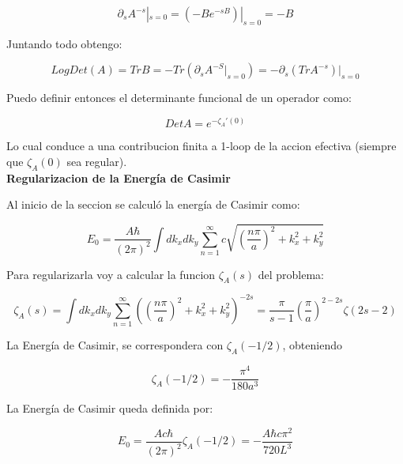 \begin{equation}
\partial _s A ^{-s} | _{s=0} = (- B e ^{-s B}) | _{s=0} = - B
\end{equation}

Juntando todo obtengo:

\begin{equation}
Log Det ( A ) = Tr B = - Tr  \left( \partial _s A ^{-S} | _{s=0} \right) =
 - \partial _s \left( Tr A ^{-s} \right) | _{s=0}
\end{equation}

Puedo definir entonces el determinante funcional de un operador como:

\begin{equation}
Det A = e ^{- \zeta _A ' (0)}
\end{equation}

Lo cual conduce a una contribucion finita a 1-loop de la accion efectiva (siempre que $\zeta _A (0)$ sea regular). \\

\textbf{Regularizacion de la Energía de Casimir}

Al inicio de la seccion se calculó la energía de Casimir como:

\begin{equation}
E _0 = \frac{A \hbar }{(2 \pi) ^2} \int dk _x dk _y 
\sum _{n=1} ^{\infty} 
c
\sqrt{
		\left( \frac{n \pi}{a } \right) ^2 + k _x ^2 + k _y ^2
		}
\end{equation}

Para regularizarla voy a calcular la funcion $\zeta _A (s)$ del problema:

\begin{equation}
\zeta _A (s) = 
\int dk _x dk _y 
\sum _{n=1} ^{\infty} 
\left(	\left( \frac{n \pi}{a } \right) ^2 + k _x ^2 + k _y ^2
		\right) ^{-2s} = 
\frac{\pi}{s-1} \left( \frac{\pi}{a} \right) ^{2-2s} \zeta (2s-2)
\end{equation}

La Energía de Casimir, se correspondera con $\zeta _A (-1/2)$, obteniendo 


\begin{equation}
\zeta _A (-1/2) = 
- \frac{\pi ^4}{180 a ^3}
\end{equation}

La Energía de Casimir queda definida por:

\begin{equation}
E _0 =  \frac{A c \hbar}{(2 \pi) ^2}
\zeta _A (-1/2) =
- \frac{A \hbar c \pi ^2}
		{720 L ^3}
\end{equation}


